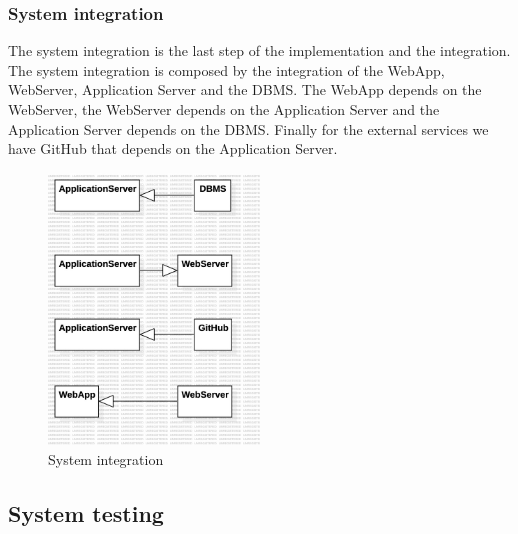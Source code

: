 \subsubsection*{System integration}
The system integration is the last step of the implementation and the integration. The system integration is composed by the integration of the WebApp, WebServer, Application Server and the DBMS. The WebApp depends on the WebServer, the WebServer depends on the Application Server and the Application Server depends on the DBMS. Finally for the external services we have GitHub that depends on the Application Server.
\begin{figure}[H]
    \centering
    \includegraphics[width=0.5\textwidth]{Diagrams/SystemIntegrationPlan.jpg}
    \caption{System integration}
    \label{fig:system_integration}
\end{figure}
\clearpage
\subsection{System testing}

